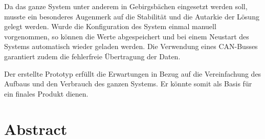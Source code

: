 Da das ganze System unter anderem in Gebirgsbächen eingesetzt werden soll, musste ein besonderes Augenmerk auf die Stabilität und die Autarkie der Lösung gelegt werden. Wurde die Konfiguration des System einmal manuell vorgenommen, so können die Werte abgespeichert und bei einem Neustart des Systems automatisch wieder geladen werden. Die Verwendung eines CAN-Busses garantiert zudem die fehlerfreie Übertragung der Daten. 

Der erstellte Prototyp erfüllt die Erwartungen in Bezug auf die Vereinfachung des Aufbaus und den Verbrauch des ganzen Systems. Er könnte somit als Basis für ein finales Produkt dienen.



\newpage
\thispagestyle{empty}
\chapter*{Abstract}\label{abstract}


